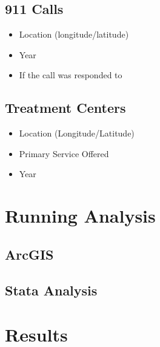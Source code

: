 \documentclass[12pt]{article}
\begin{document}
\subsection{911 Calls}
\begin{itemize}
    \item Location (longitude/latitude)
    \item Year
    \item If the call was responded to
\end{itemize}

\subsection{Treatment Centers}
\begin{itemize}
    \item Location (Longitude/Latitude)
    \item Primary Service Offered
    \item Year
\end{itemize}

\section{Running Analysis}
\label{Data Manipulation and Analysis}

\subsection{ArcGIS}

\label{Analysis}

\subsection{Stata Analysis}

\section{Results}
\end{document}
